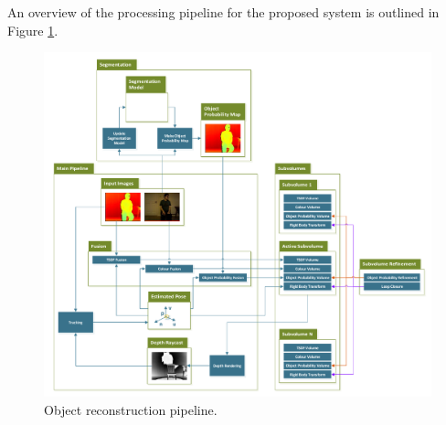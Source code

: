 An overview of the processing pipeline for the proposed system is outlined in Figure \ref{pipelineDiagram}.
\begin{figure}[!t]
	\centering
	\includegraphics[scale=0.33]{pipeline.pdf}
	\caption{Object reconstruction pipeline.}
	\label{pipelineDiagram}
\end{figure}